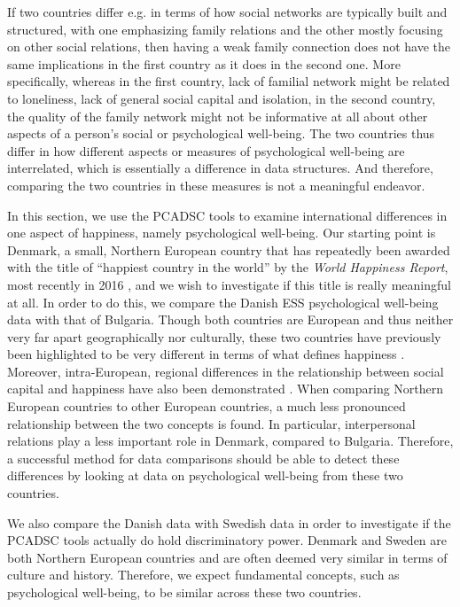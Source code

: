 \documentclass[a4paper,14pt]{article}
\begin{document}
If two countries differ e.g. in terms of how social networks are typically built and structured, with one emphasizing family relations and the other mostly focusing on other social relations, then having a weak family connection does not have the same implications in the first country as it does in the second one. More specifically, whereas in the first country, lack of familial network might be related to loneliness, lack of general social capital and isolation, in the second country, the quality of the family network might not be informative at all about other aspects of a person's social or psychological well-being. The two countries thus differ in how different aspects or measures of psychological well-being are interrelated, which is essentially a difference in data structures. And therefore, comparing the two countries in these measures is not a meaningful endeavor.

In this section, we use the PCADSC tools to examine international differences in one aspect of happiness, namely psychological well-being. Our starting point is Denmark, a small, Northern European country that has repeatedly been awarded with the title of ``happiest country in the world''  by the \textit{World Happiness Report}, most recently in 2016 \cite{WHR2016}, and we wish to investigate if this title is really meaningful at all. In order to do this, we compare the Danish ESS psychological well-being data with that of Bulgaria. Though both countries are European and thus neither very far apart geographically nor culturally, these two countries have previously been highlighted to be very different in terms of what defines happiness \cite{ESStopline5}. Moreover, intra-European, regional differences in the relationship between social capital and happiness have also been demonstrated \cite{Rodriguez2014}. When comparing Northern European countries to other European countries, a much less pronounced relationship between the two concepts is found. In particular, interpersonal relations play a less important role in Denmark, compared to Bulgaria. Therefore, a successful method for data comparisons should be able to detect these differences by looking at data on psychological well-being from these two countries.

We also compare the Danish data with Swedish data in order to investigate if the PCADSC tools actually do hold discriminatory power. Denmark and Sweden are both Northern European countries and are often deemed very similar in terms of culture and history. Therefore, we expect fundamental concepts, such as psychological well-being, to be similar across these two countries.
\end{document}
